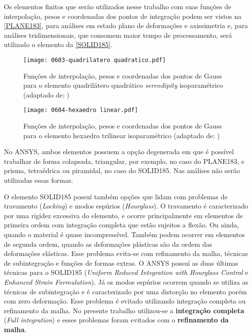 Os elementos finitos que serão utilizados nesse trabalho com suas funções de interpolação, pesos e coordenadas dos pontos de integração podem ser vistos na \autoref{PLANE183}, para análises em estado plano de deformações e axissimetria e, para análises tridimensionais, que consomem maior tempo de processamento, será utilizado o elemento da \autoref{SOLID185}.
\begin{figure}[H]
	\begin{center}
		\texttt{[image: 0603-quadrilatero quadratico.pdf]}
	\end{center}
	\caption{\label{PLANE183}Funções de interpolação, pesos e coordenadas dos pontos de Gauss para o elemento quadrilátero quadrático \textit{serendipity} isoparamétrico (adaptado de: )}
\end{figure}
\begin{figure}[H]
	\begin{center}
		\texttt{[image: 0604-hexaedro linear.pdf]}
	\end{center}
	\caption{\label{SOLID185}Funções de interpolação, pesos e coordenadas dos pontos de Gauss para o elemento hexaedro trilinear isoparamétrico (adaptado de: )}
\end{figure}

No ANSYS, ambos elementos possuem a opção degenerada em que é possível trabalhar de forma colapsada, triangular, por exemplo, no caso do PLANE183, e prisma, tetraédrica ou piramidal, no caso do SOLID185. Nas análises não serão utilizadas essas formas. 

O elemento SOLID185 possuí também opções que lidam com problemas de travamento (\textit{Locking}) e modos espúrios (\textit{Hourglass}). O travamento é caracterizado por uma rigidez excessiva do elemento, e ocorre principalmente em elementos de primeira ordem com integração completa que estão sujeitos a flexão. Ou ainda, quando o material é quase incompressível. Também podem ocorrer em elementos de segunda ordem, quando as deformações plásticas são da ordem das deformações elásticas. Esse problema evita-se com refinamento da malha, técnicas de subintegração e funções de formas extras. O ANSYS possuí as duas últimas técnicas para o SOLID185 (\textit{Uniform Reduced Integration with Hourglass Control} e \textit{Enhanced Strain Formulation}). Já os modos espúrios ocorrem quando se utiliza as técnicas de subintegração e é caracterizado por uma distorção no elemento porém com zero deformação. Esse problema é evitado utilizando integração completa ou refinamento da malha. No presente trabalho utilizou-se a \textbf{integração completa} (\textit{Full integration}) e esses problemas foram evitados com o \textbf{refinamento da malha}. 

